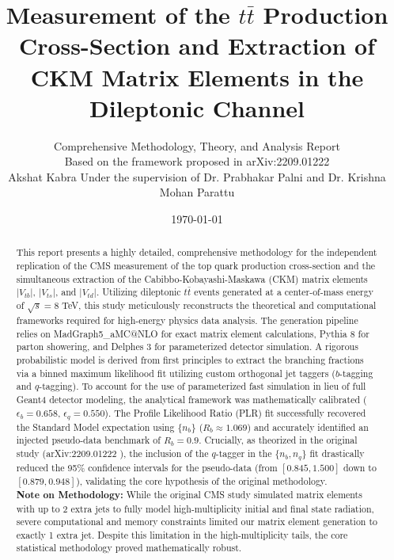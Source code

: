 \documentclass[11pt,a4paper]{article}
\title{\textbf{Measurement of the $t\bar{t}$ Production Cross-Section and Extraction of CKM Matrix Elements in the Dileptonic Channel}}
\author{Comprehensive Methodology, Theory, and Analysis Report \\ \small Based on the framework proposed in arXiv:2209.01222 \cite{cms_paper} \\
Akshat Kabra
Under the supervision of Dr. Prabhakar Palni and Dr. Krishna Mohan Parattu}
\date{\today}
\begin{document}
\maketitle

\begin{abstract}
This report presents a highly detailed, comprehensive methodology for the independent replication of the CMS measurement of the top quark production cross-section and the simultaneous extraction of the Cabibbo-Kobayashi-Maskawa (CKM) matrix elements $|V_{tb}|$, $|V_{ts}|$, and $|V_{td}|$. Utilizing dileptonic $t\bar{t}$ events generated at a center-of-mass energy of $\sqrt{s}=8$ TeV, this study meticulously reconstructs the theoretical and computational frameworks required for high-energy physics data analysis. The generation pipeline relies on MadGraph5\_aMC@NLO \cite{madgraph} for exact matrix element calculations, Pythia 8 \cite{pythia} for parton showering, and Delphes 3 \cite{delphes} for parameterized detector simulation. A rigorous probabilistic model is derived from first principles to extract the branching fractions via a binned maximum likelihood fit utilizing custom orthogonal jet taggers ($b$-tagging and $q$-tagging). To account for the use of parameterized fast simulation in lieu of full Geant4 detector modeling, the analytical framework was mathematically calibrated ($\epsilon_b = 0.658$, $\epsilon_q = 0.550$). The Profile Likelihood Ratio (PLR) fit successfully recovered the Standard Model expectation using $\{n_b\}$ ($R_b \approx 1.069$) and accurately identified an injected pseudo-data benchmark of $R_b = 0.9$. Crucially, as theorized in the original study (arXiv:2209.01222 \cite{cms_paper}), the inclusion of the $q$-tagger in the $\{n_b, n_q\}$ fit drastically reduced the 95\% confidence intervals for the pseudo-data (from $[0.845, 1.500]$ down to $[0.879, 0.948]$), validating the core hypothesis of the original methodology. \\
\noindent \textbf{Note on Methodology:} While the original CMS study \cite{cms_paper} simulated matrix elements with up to 2 extra jets to fully model high-multiplicity initial and final state radiation, severe computational and memory constraints limited our matrix element generation to exactly 1 extra jet. Despite this limitation in the high-multiplicity tails, the core statistical methodology proved mathematically robust.
\end{abstract}

\tableofcontents
\newpage

\end{document}
